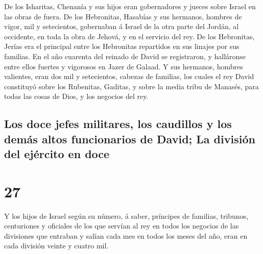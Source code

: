  De los Isharitas, Chenanía y sus hijos eran gobernadores y
jueces sobre Israel en las obras de fuera.  De los
Hebronitas, Hasabías y sus hermanos, hombres de vigor, mil y
setecientos, gobernaban á Israel de la otra parte del Jordán, al
occidente, en toda la obra de Jehová, y en el servicio del rey.
 De los Hebronitas, Jerías era el principal entre los
Hebronitas repartidos en sus linajes por sus familias. En el año
cuarenta del reinado de David se registraron, y halláronse entre ellos
fuertes y vigorosos en Jazer de Galaad.  Y sus hermanos,
hombres valientes, eran dos mil y setecientos, cabezas de familias, los
cuales el rey David constituyó sobre los Rubenitas, Gaditas, y sobre la
media tribu de Manasés, para todas las cosas de Dios, y los negocios del
rey.

\hypertarget{los-doce-jefes-militares-los-caudillos-y-los-demuxe1s-altos-funcionarios-de-david-la-divisiuxf3n-del-ejuxe9rcito-en-doce}{%
\subsection{Los doce jefes militares, los caudillos y los demás altos
funcionarios de David; La división del ejército en
doce}\label{los-doce-jefes-militares-los-caudillos-y-los-demuxe1s-altos-funcionarios-de-david-la-divisiuxf3n-del-ejuxe9rcito-en-doce}}

\hypertarget{section-26}{%
\section{27}\label{section-26}}

 Y los hijos de Israel según su número, á saber, príncipes
de familias, tribunos, centuriones y oficiales de los que servían al rey
en todos los negocios de las divisiones que entraban y salían cada mes
en todos los meses del año, eran en cada división veinte y cuatro mil.

